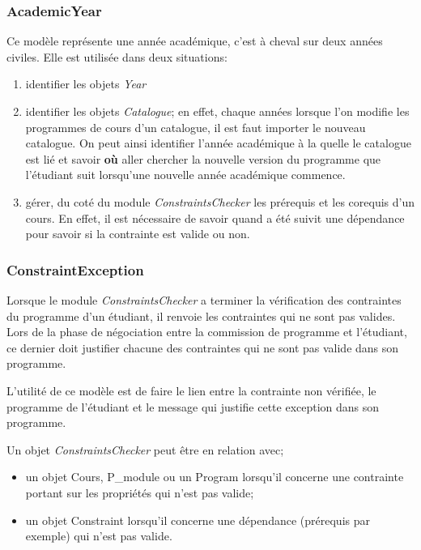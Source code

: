 \subsubsection{AcademicYear}
Ce modèle représente une année académique, c'est à cheval sur deux années civiles. Elle est utilisée dans deux situations:
\begin{enumerate}
  \item identifier les objets \textit{Year} 
  \item identifier les objets \textit{Catalogue}; en effet, chaque années lorsque l'on modifie les programmes de cours d'un catalogue, il est faut importer le nouveau catalogue. On peut ainsi identifier l'année académique à la quelle le catalogue est lié et savoir \textbf{où} aller chercher la nouvelle version du programme que l'étudiant suit lorsqu'une nouvelle année académique commence.
  \item gérer, du coté du module \textit{ConstraintsChecker} les prérequis et les corequis d'un cours. En effet, il est nécessaire de savoir quand a été suivit une dépendance pour savoir si la contrainte est valide ou non. 
\end{enumerate}

\subsubsection{ConstraintException}
Lorsque le module \textit{ConstraintsChecker} a terminer la vérification des contraintes du programme d'un étudiant, il renvoie les contraintes qui ne sont pas valides. Lors de la phase de négociation entre la commission de programme et l'étudiant, ce dernier doit justifier chacune des contraintes qui ne sont pas valide dans son programme.

L'utilité de ce modèle est de faire le lien entre la contrainte non vérifiée, le programme de l'étudiant et le message qui justifie cette exception dans son programme. 

Un objet \textit{ConstraintsChecker} peut être en relation avec;

\begin{itemize}
\item un objet Cours, P\_module ou un Program lorsqu’il concerne une contrainte portant sur les propriétés qui n'est pas valide;
\item un objet Constraint lorsqu'il concerne une dépendance (prérequis par exemple) qui n'est pas valide.
\end{itemize}

